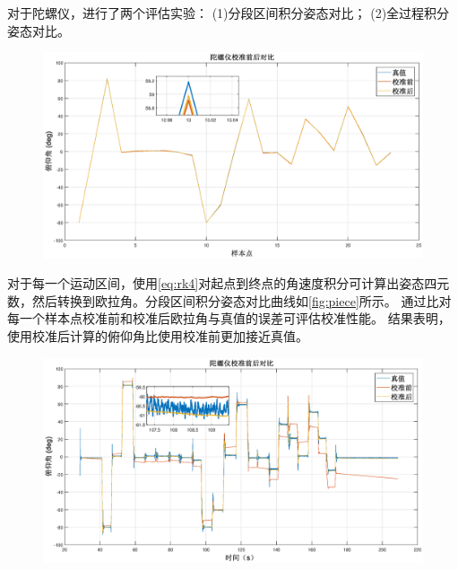 \documentclass[
  type=master
]{gdutthesis}
\begin{document}
对于陀螺仪，进行了两个评估实验：
(1)分段区间积分姿态对比；
(2)全过程积分姿态对比。
\begin{figure}[H]
	\centering
	\includegraphics[width=1.0\textwidth]{piece1.eps}
	\label{fig:piece}
\end{figure}
对于每一个运动区间，使用\autoref{eq:rk4}对起点到终点的角速度积分可计算出姿态四元数，然后转换到欧拉角。分段区间积分姿态对比曲线如\autoref{fig:piece}所示。
通过比对每一个样本点校准前和校准后欧拉角与真值的误差可评估校准性能。
结果表明，使用校准后计算的俯仰角比使用校准前更加接近真值。
\begin{figure}[H]
	\centering
	\includegraphics[width=1.0\textwidth]{full1.eps}
	\label{fig:full}
\end{figure}
\end{document}
